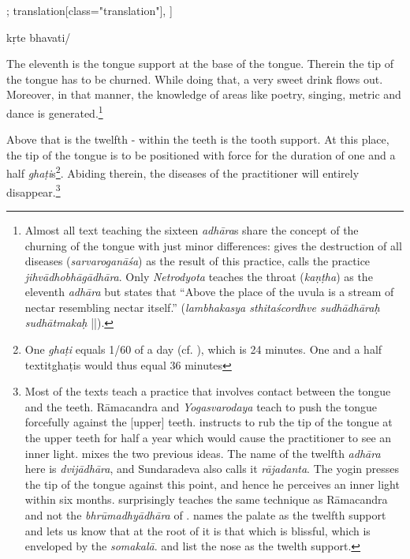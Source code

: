 \begin{alignment}[
  texts=edition[class="edition"];
  translation[class="translation"],
  ]
\begin{edition}
\begin{prose}
{  
  }
kṛte
bhavati/
    \end{prose}
  \end{edition}
  \begin{translation}
    \begin{tlate}
      \noindent      
      The eleventh is the tongue support at the base of the tongue. Therein the tip of the tongue has to be churned. While doing that, a very sweet drink flows out. Moreover, in that manner, the knowledge of areas like poetry, singing, metric and dance is generated.\footnote{Almost all text teaching the sixteen \textit{adhāra}s share the concept of the churning of the tongue with just minor differences:  gives the destruction of all diseases (\textit{sarvaroganāśa}) as the result of this practice,  calls the practice \textit{jihvādhobhāgādhāra}. Only \textit{Netrodyota} teaches the throat (\textit{kaṇṭha}) as the eleventh \textit{adhāra} but states that ``Above the place of the uvula is a stream of nectar resembling nectar itself.'' (\textit{lambhakasya sthitaścordhve sudhādhāraḥ sudhātmakaḥ} ||).}
    
      Above that is the twelfth - within the teeth is the tooth support. At this place, the tip of the tongue is to be positioned with force for the duration of one and a half \textit{ghaṭi}s\footnote{One \textit{ghaṭi} equals 1/60 of a day (cf. \citeauthor[1966: 114]{sircar1966}), which is 24 minutes. One and a half textit{ghaṭi}s would thus equal 36 minutes}. Abiding therein, the diseases of the practitioner will entirely disappear.\footnote{Most of the texts teach a practice that involves contact between the tongue and the teeth. Rāmacandra and \textit{Yogasvarodaya} teach to push the tongue forcefully against the [upper] teeth.  instructs to rub the tip of the tongue at the upper teeth for half a year which would cause the practitioner to see an inner light.  mixes the two previous ideas. The name of the twelfth \textit{adhāra} here is \textit{dvijādhāra}, and Sundaradeva also calls it \textit{rājadanta}. The yogin presses the tip of the tongue against this point, and hence he perceives an inner light within six months.  surprisingly teaches the same technique as Rāmacandra and not the \textit{bhrūmadhyādhāra} of .  names the palate as the twelfth support and lets us know that at the root of it is that which is blissful, which is enveloped by the \textit{somakalā}.  and  list the nose as the twelth support.}    
     

\end{tlate}
\end{translation}
\end{alignment}
